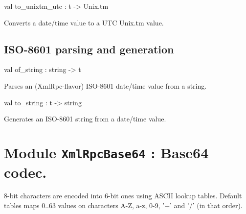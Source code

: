 \documentclass[11pt]{article}
\begin{document}
\label{val:XmlRpcDateTime.to-underscoreunixtm-underscoreutc}\begin{ocamldoccode}
val to_unixtm_utc : t -> Unix.tm
\end{ocamldoccode}
\begin{ocamldocdescription}
Converts a date/time value to a UTC Unix.tm value.


\end{ocamldocdescription}




\subsection{ISO-8601 parsing and generation}




\label{val:XmlRpcDateTime.of-underscorestring}\begin{ocamldoccode}
val of_string : string -> t
\end{ocamldoccode}
\begin{ocamldocdescription}
Parses an (XmlRpc-flavor) ISO-8601 date/time value from a string.


\end{ocamldocdescription}




\label{val:XmlRpcDateTime.to-underscorestring}\begin{ocamldoccode}
val to_string : t -> string
\end{ocamldoccode}
\begin{ocamldocdescription}
Generates an ISO-8601 string from a date/time value.


\end{ocamldocdescription}


\section{Module {\tt{XmlRpcBase64}} : Base64 codec.}
\label{module:XmlRpcBase64}



	8-bit characters are encoded into 6-bit ones using ASCII lookup tables.
	Default tables maps 0..63 values on characters A-Z, a-z, 0-9, '+' and '/'
	(in that order).



\ocamldocvspace{0.5cm}
\end{document}

